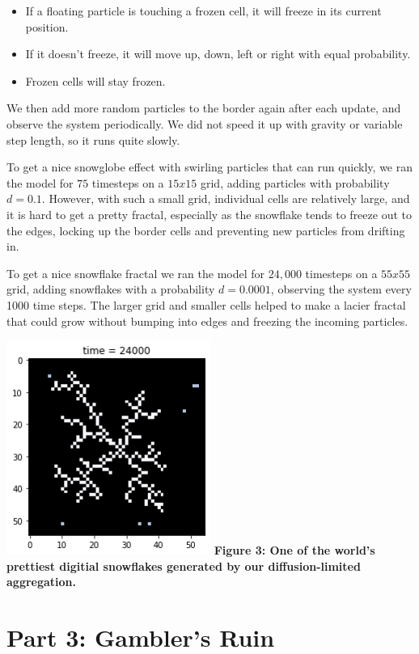 \documentclass[]{article}
\providecommand{\tightlist}{%
  \setlength{\itemsep}{0pt}\setlength{\parskip}{0pt}}
\begin{document}
\begin{itemize}
\tightlist
\item
  If a floating particle is touching a frozen cell, it will freeze in
  its current position.
\item
  If it doesn't freeze, it will move up, down, left or right with equal
  probability.
\item
  Frozen cells will stay frozen.
\end{itemize}

We then add more random particles to the border again after each update,
and observe the system periodically. We did not speed it up with gravity
or variable step length, so it runs quite slowly.

To get a nice snowglobe effect with swirling particles that can run
quickly, we ran the model for \(75\) timesteps on a \(15 x 15\) grid,
adding particles with probability \(d = 0.1\). However, with such a
small grid, individual cells are relatively large, and it is hard to get
a pretty fractal, especially as the snowflake tends to freeze out to the
edges, locking up the border cells and preventing new particles from
drifting in.

To get a nice snowflake fractal we ran the model for \(24,000\)
timesteps on a \(55 x 55\) grid, adding snowflakes with a probability
\(d = 0.0001\), observing the system every 1000 time steps. The larger
grid and smaller cells helped to make a lacier fractal that could grow
without bumping into edges and freezing the incoming particles.

\includegraphics[width=0.5\textwidth,height=\textheight]{../plots/Snowflake.png}
\textbf{Figure 3: One of the world's prettiest digitial snowflakes
generated by our diffusion-limited aggregation.}

\pagebreak

\hypertarget{part-3-gamblers-ruin}{%
\section{Part 3: Gambler's Ruin}\label{part-3-gamblers-ruin}}
\end{document}
